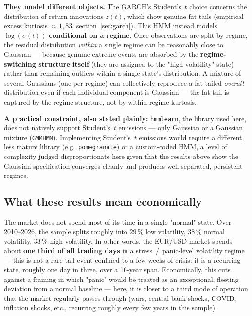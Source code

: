 \documentclass[12pt,a4paper]{article}
\begin{document}
\textbf{They model different objects.} The GARCH's
Student's~$t$ choice concerns the distribution of return
innovations $z(t)$, which show genuine fat tails (empirical excess
kurtosis $\approx 1{,}83$, section~\ref{sec:garch}). This HMM instead
models $\log(\sigma(t))$ \textbf{conditional on a regime}.
Once observations are split by regime, the residual
distribution \emph{within} a single regime can be reasonably
close to Gaussian --- because genuine extreme events are
absorbed by the \textbf{regime-switching structure itself}
(they are assigned to the "high volatility" state) rather than
remaining outliers within a single state's distribution. A
mixture of several Gaussians (one per regime) can
collectively reproduce a fat-tailed \emph{overall}
distribution even if each individual component is Gaussian --- the
fat tail is captured by the regime structure, not by
within-regime kurtosis.

\textbf{A practical constraint, also stated plainly:}
\texttt{hmmlearn}, the library used here, does not natively
support Student's~$t$ emissions --- only Gaussian or a
Gaussian mixture (\texttt{GMMHMM}). Implementing
Student's~$t$ emissions would require a different, less mature
library (e.g.\ \texttt{pomegranate}) or a custom-coded HMM, a
level of complexity judged disproportionate here given that the
results above show the Gaussian specification converges cleanly and produces
well-separated, persistent regimes.

\subsection{What these results mean economically}

\begin{econbox}
	
	The market does not spend most of its time in a single "normal" state.
	Over 2010--2026, the sample splits roughly into
	$29\,\%$ low volatility, $38\,\%$ normal volatility, $33\,\%$
	high volatility. In other words, the EUR/USD market spends about
	\textbf{one third of all trading days} in a
	stress~/~panic-level volatility regime --- this is not a rare
	tail event confined to a few weeks of crisis; it is a
	recurring state, roughly one day in three, over a 16-year span.
	Economically, this cuts against a framing in which "panic"
	would be treated as an exceptional, fleeting deviation from a
	normal baseline --- here, it is closer to a third mode of
	operation that the market regularly passes through (wars, central bank
	shocks, COVID, inflation shocks, etc., recurring roughly
	every few years in this sample).
\end{econbox}
\end{document}
